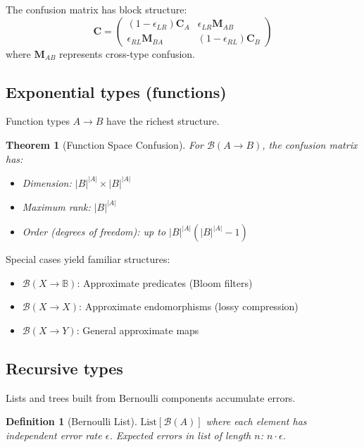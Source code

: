 \documentclass[11pt,final,hidelinks]{article}
\newcommand{\Bool}{\mathbb{B}}     %
\newcommand{\Ber}[1]{\mathcal{B}(#1)}  %
\theoremstyle{plain}
\newtheorem{theorem}{Theorem}[section]
\newtheorem{definition}{Definition}[section]
\begin{document}
The confusion matrix has block structure:
\begin{equation}
\mathbf{C} = \begin{pmatrix}
(1-\epsilon_{LR}) \mathbf{C}_A & \epsilon_{LR} \mathbf{M}_{AB} \\
\epsilon_{RL} \mathbf{M}_{BA} & (1-\epsilon_{RL}) \mathbf{C}_B
\end{pmatrix}
\end{equation}
where $\mathbf{M}_{AB}$ represents cross-type confusion.

\subsection{Exponential types (functions)}

Function types $A \to B$ have the richest structure.

\begin{theorem}[Function Space Confusion]
For $\Ber{A \to B}$, the confusion matrix has:
\begin{itemize}
\item Dimension: $|B|^{|A|} \times |B|^{|A|}$
\item Maximum rank: $|B|^{|A|}$
\item Order (degrees of freedom): up to $|B|^{|A|}(|B|^{|A|} - 1)$
\end{itemize}
\end{theorem}

Special cases yield familiar structures:
\begin{itemize}
\item $\Ber{X \to \Bool}$: Approximate predicates (Bloom filters)
\item $\Ber{X \to X}$: Approximate endomorphisms (lossy compression)
\item $\Ber{X \to Y}$: General approximate maps
\end{itemize}

\subsection{Recursive types}

Lists and trees built from Bernoulli components accumulate errors.

\begin{definition}[Bernoulli List]
$\text{List}[\Ber{A}]$ where each element has independent error rate $\epsilon$.
Expected errors in list of length $n$: $n \cdot \epsilon$.
\end{definition}
\end{document}

